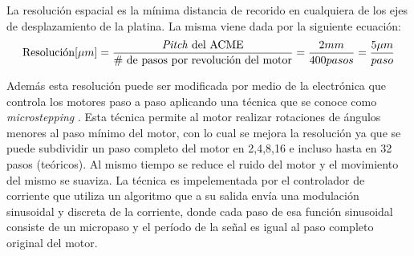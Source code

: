 \begin{figure}[H]
	\begin{floatrow}
	\end{floatrow}
\end{figure}

La resolución espacial es la mínima distancia de recorido en cualquiera de los ejes de desplazamiento de la platina. La misma viene dada por la siguiente ecuación:
\begin{equation}
\text{Resolución} [\mu m] = \frac{\text{\textit{Pitch} del ACME}}{\text{\# de pasos por revolución del motor}} = \frac{2 mm}{400 pasos} = \frac{5 \mu m}{paso}
\end{equation}

Además esta resolución puede ser modificada por medio de la electrónica que controla los motores paso a paso aplicando una técnica que se conoce como \textit{microstepping} \cite{7806244}. Esta técnica permite al motor realizar rotaciones de ángulos menores al paso mínimo del motor, con lo cual se mejora la resolución ya que se puede subdividir un paso completo del motor en 2,4,8,16 e incluso hasta en 32 pasos (teóricos). Al mismo tiempo se reduce el ruido del motor y el movimiento del mismo se suaviza. La técnica es impelementada por el controlador de corriente que utiliza un algoritmo que a su salida envía una modulación sinusoidal y discreta de la corriente, donde cada paso de esa función sinusoidal consiste de un micropaso y el período de la señal es igual al paso completo original del motor.

